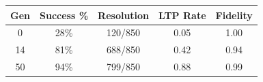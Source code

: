 \begin{tabular}{ccccc}
\toprule
\textbf{Gen} & \textbf{Success \%} & \textbf{Resolution} & \textbf{LTP Rate} & \textbf{Fidelity} \\
\midrule
0 & 28\% & 120/850 & 0.05 & 1.00 \\
14 & 81\% & 688/850 & 0.42 & 0.94 \\
50 & 94\% & 799/850 & 0.88 & 0.99 \\
\bottomrule
\end{tabular}

